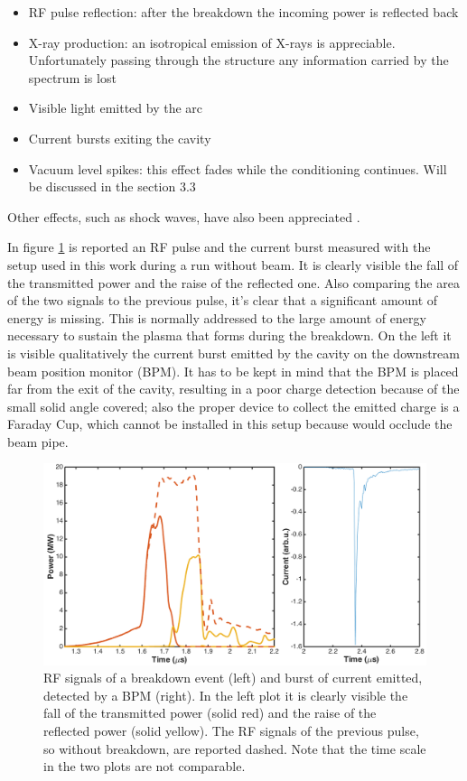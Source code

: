 \begin{itemize}
\item RF pulse reflection: after the breakdown the incoming power is reflected back
\item X-ray production: an isotropical emission of X-rays is appreciable. Unfortunately passing through the structure any information carried by the spectrum is lost
\item Visible light emitted by the arc
\item Current bursts exiting the cavity
\item Vacuum level spikes: this effect fades while the conditioning continues. Will be discussed in the section 3.3 
\end{itemize}
Other effects, such as shock waves, have also been appreciated \cite{Rajamaki:2143815}. 

In figure \ref{RFandBPM} is reported an RF pulse and the current burst measured with the setup used in this work during a run without beam. It is clearly visible the fall of the transmitted power and the raise of the reflected one. Also comparing the area of the two signals to the previous pulse, it's clear that a significant amount of energy is missing. This is normally addressed to the large amount of energy necessary to sustain the plasma that forms during the breakdown. On the left it is visible qualitatively the current burst emitted by the cavity on the downstream beam position monitor (BPM). It has to be kept in mind that the BPM is placed far from the exit of the cavity, resulting in a poor charge detection because of the small solid angle covered; also the proper device to collect the emitted charge is a Faraday Cup, which cannot be installed in this setup because would occlude the beam pipe. 


\begin{figure}[h]
\centering
\includegraphics[scale=0.33]{pictures/RFandBPM.png}
\caption{RF signals of a breakdown event (left) and burst of current emitted, detected by a BPM (right). In the left plot it is clearly visible the fall of the transmitted power (solid red) and the raise of the reflected power (solid yellow). The RF signals of the previous pulse, so without breakdown, are reported dashed. Note that the time scale in the two plots are not comparable.}
\label{RFandBPM}
\end{figure}




